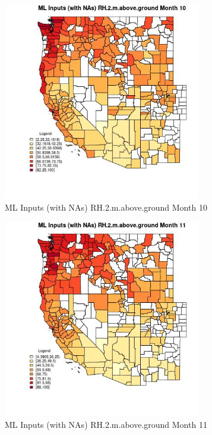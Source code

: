\begin{figure} 
\centering  
\includegraphics[width=0.77\textwidth]{Code_Outputs/Report_ML_input_PM25_Step4_part_f_de_duplicated_aves_prioritize_24hr_obswNAs_CountyRH2mabovegroundmedianMonth10.jpg} 
\caption{\label{fig:Report_ML_input_PM25_Step4_part_f_de_duplicated_aves_prioritize_24hr_obswNAsCountyRH2mabovegroundmedianMonth10}ML Inputs (with NAs) RH.2.m.above.ground Month 10} 
\end{figure} 
 

\begin{figure} 
\centering  
\includegraphics[width=0.77\textwidth]{Code_Outputs/Report_ML_input_PM25_Step4_part_f_de_duplicated_aves_prioritize_24hr_obswNAs_CountyRH2mabovegroundmedianMonth11.jpg} 
\caption{\label{fig:Report_ML_input_PM25_Step4_part_f_de_duplicated_aves_prioritize_24hr_obswNAsCountyRH2mabovegroundmedianMonth11}ML Inputs (with NAs) RH.2.m.above.ground Month 11} 
\end{figure} 
 

